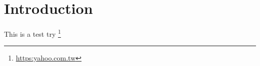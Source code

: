 
    \chapter{Introduction}%
    This is a test try \cite{wang2005jia} \footnote{\url{https:yahoo.com.tw}}
